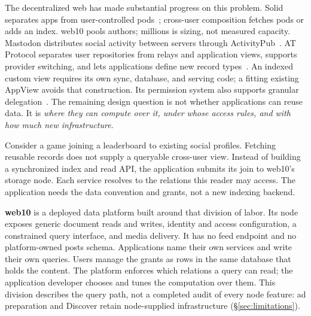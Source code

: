 \documentclass[sigconf, nonacm]{acmart}
\begin{document}
The decentralized web has made substantial progress on this problem.
Solid separates apps from user-controlled pods~\cite{solid2016,solid-protocol2024};
cross-user composition fetches pods or adds an index. web10 pools authors;
millions is sizing, not measured capacity.
Mastodon distributes social activity between servers through
ActivityPub~\cite{activitypub2018}. AT Protocol separates user repositories
from relays and application views, supports provider switching, and lets
applications define new record types~\cite{kleppmann2024,at-statusphere}.
An indexed custom view requires its own sync, database, and serving code;
a fitting existing AppView avoids that construction.
Its permission system also supports granular delegation~\cite{at-permissions}.
The remaining design question is not whether applications can reuse
data. It is \emph{where they can compute over it, under whose access
rules, and with how much new infrastructure}.

Consider a game joining a leaderboard to existing social profiles.
Fetching reusable records does not supply a queryable cross-user view.
Instead of building a synchronized index and read API, the application
submits its join to web10's storage node. Each service resolves to the
relations this reader may access. The application needs the data
convention and grants, not a new indexing backend.

\textbf{web10} is a deployed data platform built around that division of
labor. Its node exposes generic document reads and writes, identity and
access configuration, a constrained query interface, and media delivery.
It has no feed endpoint and no platform-owned posts schema. Applications
name their own services and write their own queries. Users manage the
grants as rows in the same database that holds the content. The platform
enforces which relations a query can read; the application developer
chooses and tunes the computation over them. This division describes the
query path, not a completed audit of every node feature: ad preparation
and Discover retain node-supplied infrastructure (\S\ref{sec:limitations}).
\end{document}
